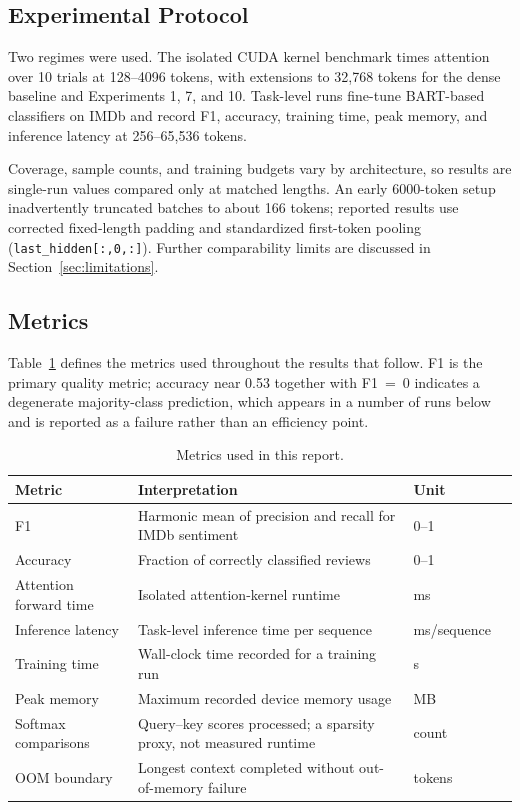 \documentclass[11pt]{article}
\begin{document}
\subsection{Experimental Protocol}
\label{sec:protocol}

Two regimes were used. The isolated CUDA kernel benchmark times attention
over 10 trials at 128--4096 tokens, with extensions to 32{,}768 tokens for the
dense baseline and Experiments 1, 7, and 10. Task-level runs fine-tune
BART-based classifiers on IMDb and record F1, accuracy, training time, peak
memory, and inference latency at 256--65{,}536 tokens.

Coverage, sample counts, and training budgets vary by architecture, so results
are single-run values compared only at matched lengths. An early 6000-token
setup inadvertently truncated batches to about 166 tokens; reported results
use corrected fixed-length padding and standardized first-token pooling
(\texttt{last\_hidden[:,0,:]}). Further comparability limits are discussed in
Section~\ref{sec:limitations}.

\subsection{Metrics}
\label{sec:metrics}

Table~\ref{tab:metrics} defines the metrics used throughout the results that
follow. F1 is the primary quality metric; accuracy near 0.53 together with
F1~=~0 indicates a degenerate majority-class prediction, which appears in a
number of runs below and is reported as a failure rather than an efficiency
point.

\begin{table}[ht]
  \centering
  \small
  \caption{Metrics used in this report.}
  \label{tab:metrics}
  \begin{tabularx}{\textwidth}{@{}lXll@{}}
    \toprule
    Metric & Interpretation & Unit \\
    \midrule
    F1 & Harmonic mean of precision and recall for IMDb sentiment & 0--1  \\
    Accuracy & Fraction of correctly classified reviews & 0--1  \\
    Attention forward time & Isolated attention-kernel runtime & ms  \\
    Inference latency & Task-level inference time per sequence & ms/sequence  \\
    Training time & Wall-clock time recorded for a training run & s  \\
    Peak memory & Maximum recorded device memory usage & MB  \\
    Softmax comparisons & Query--key scores processed; a sparsity proxy, not
      measured runtime & count  \\
    OOM boundary & Longest context completed without out-of-memory failure
      & tokens  \\
    \bottomrule
  \end{tabularx}
\end{table}
\end{document}
